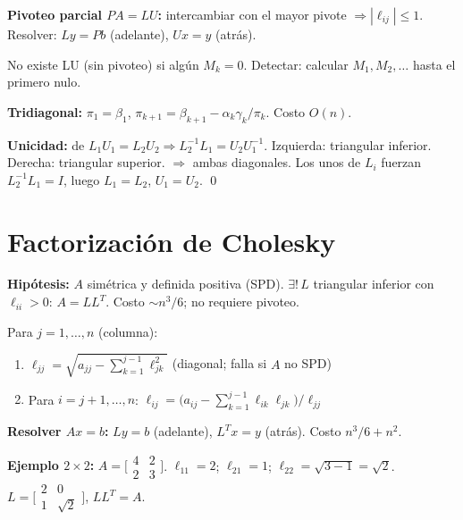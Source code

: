 \documentclass[12pt,a4paper]{article}
\begin{document}
\textbf{Pivoteo parcial $PA=LU$:} intercambiar con el mayor pivote $\Rightarrow |\ell_{ij}|\le1$. Resolver: $Ly=Pb$ (adelante), $Ux=y$ (atrás).

\begin{alerta}
No existe LU (sin pivoteo) si algún $M_k=0$. Detectar: calcular $M_1,M_2,\ldots$ hasta el primero nulo.
\end{alerta}

\textbf{Tridiagonal:} $\pi_1=\beta_1$, $\pi_{k+1}=\beta_{k+1}-\alpha_k\gamma_k/\pi_k$. Costo $O(n)$.

\begin{resultado}
\textbf{Unicidad:} de $L_1U_1=L_2U_2 \Rightarrow L_2^{-1}L_1=U_2U_1^{-1}$. Izquierda: triangular inferior. Derecha: triangular superior. $\Rightarrow$ ambas diagonales. Los unos de $L_i$ fuerzan $L_2^{-1}L_1=I$, luego $L_1=L_2$, $U_1=U_2$. \qed
\end{resultado}

\section{Factorización de Cholesky}

\textbf{Hipótesis:} $A$ simétrica y definida positiva (SPD). $\exists!\,L$ triangular inferior con $\ell_{ii}>0$: $A=LL^T$. Costo $\sim n^3/6$; no requiere pivoteo.

\begin{algoritmo}[title={Factorización de Cholesky: $A=LL^T$}]
Para $j=1,\ldots,n$ (columna):
\begin{enumerate}[noitemsep]
  \item $\ell_{jj}=\sqrt{a_{jj}-\sum_{k=1}^{j-1}\ell_{jk}^2}$ \quad(diagonal; falla si $A$ no SPD)
  \item Para $i=j+1,\ldots,n$: $\ell_{ij}=\bigl(a_{ij}-\sum_{k=1}^{j-1}\ell_{ik}\ell_{jk}\bigr)/\ell_{jj}$
\end{enumerate}
\textbf{Resolver $Ax=b$:} $Ly=b$ (adelante), $L^Tx=y$ (atrás). Costo $n^3/6+n^2$.
\end{algoritmo}

\textbf{Ejemplo $2\times2$:} $A=\bigl[\begin{smallmatrix}4&2\\2&3\end{smallmatrix}\bigr]$.
$\ell_{11}=2$; $\ell_{21}=1$; $\ell_{22}=\sqrt{3-1}=\sqrt{2}$.
$L=\bigl[\begin{smallmatrix}2&0\\1&\sqrt{2}\end{smallmatrix}\bigr]$, $LL^T=A$. \checkmark
\end{document}
